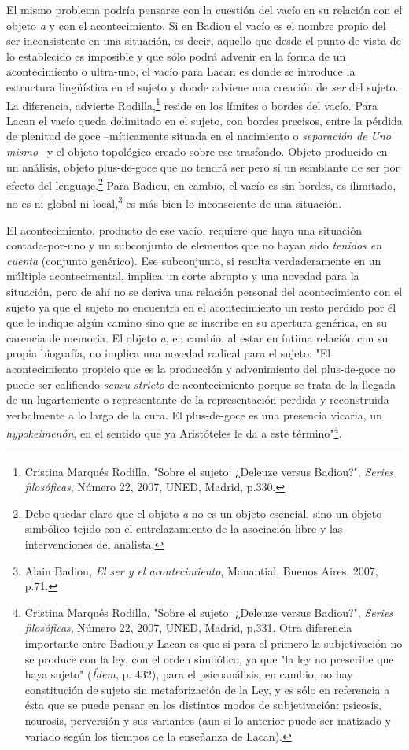 \documentclass{book}
\begin{document}
El mismo problema podría pensarse con la cuestión del vacío en su
relación con el objeto \emph{a} y con el acontecimiento. Si en Badiou el
vacío es el nombre propio del ser inconsistente en una situación, es
decir, aquello que desde el punto de vista de lo establecido es
imposible y que sólo podrá advenir en la forma de un acontecimiento o
ultra-uno, el vacío para Lacan es donde se introduce la estructura
lingüística en el sujeto y donde adviene una creación de \emph{ser} del
sujeto. La diferencia, advierte Rodilla,\footnote{Cristina Marqués
  Rodilla, "Sobre el sujeto: ¿Deleuze versus Badiou?", \emph{Series
  filosóficas}, Número 22, 2007, UNED, Madrid, p.330.} reside en los
límites o bordes del vacío. Para Lacan el vacío queda delimitado en el
sujeto, con bordes precisos, entre la pérdida de plenitud de goce
--míticamente situada en el nacimiento o \emph{separación de Uno
mismo}-- y el objeto topológico creado sobre ese trasfondo. Objeto
producido en un análisis, objeto plus-de-goce que no tendrá ser pero sí
un semblante de ser por efecto del lenguaje.\footnote{Debe quedar claro
  que el objeto \emph{a} no es un objeto esencial, sino un objeto
  simbólico tejido con el entrelazamiento de la asociación libre y las
  intervenciones del analista.} Para Badiou, en cambio, el vacío es sin
bordes, es ilimitado, no es ni global ni local,\footnote{Alain Badiou,
  \emph{El ser y el acontecimiento}, Manantial, Buenos Aires, 2007,
  p.71.} es más bien lo inconsciente de una situación.

El acontecimiento, producto de ese vacío, requiere que haya una
situación contada-por-uno y un subconjunto de elementos que no hayan
sido \emph{tenidos en cuenta} (conjunto genérico). Ese subconjunto, si
resulta verdaderamente en un múltiple acontecimental, implica un corte
abrupto y una novedad para la situación, pero de ahí no se deriva una
relación personal del acontecimiento con el sujeto ya que el sujeto no
encuentra en el acontecimiento un resto perdido por él que le indique
algún camino sino que se inscribe en su apertura genérica, en su
carencia de memoria. El objeto \emph{a}, en cambio, al estar en íntima
relación con su propia biografía, no implica una novedad radical para el
sujeto: "El acontecimiento propicio que es la producción y advenimiento
del plus-de-goce no puede ser calificado \emph{sensu stricto} de
acontecimiento porque se trata de la llegada de un lugarteniente o
representante de la representación perdida y reconstruida verbalmente a
lo largo de la cura. El plus-de-goce es una presencia vicaria, un
\emph{hypokeimenón}, en el sentido que ya Aristóteles le da a este
término"\footnote{Cristina Marqués Rodilla, "Sobre el sujeto: ¿Deleuze
  versus Badiou?", \emph{Series filosóficas}, Número 22, 2007, UNED,
  Madrid, p.331. Otra diferencia importante entre Badiou y Lacan es que
  si para el primero la subjetivación no se produce con la ley, con el
  orden simbólico, ya que "la ley no prescribe que haya sujeto"
  (\emph{Ídem}, p. 432), para el psicoanálisis, en cambio, no hay
  constitución de sujeto sin metaforización de la Ley, y es sólo en
  referencia a ésta que se puede pensar en los distintos modos de
  subjetivación: psicosis, neurosis, perversión y sus variantes (aun si
  lo anterior puede ser matizado y variado según los tiempos de la
  enseñanza de Lacan).}.
\end{document}
